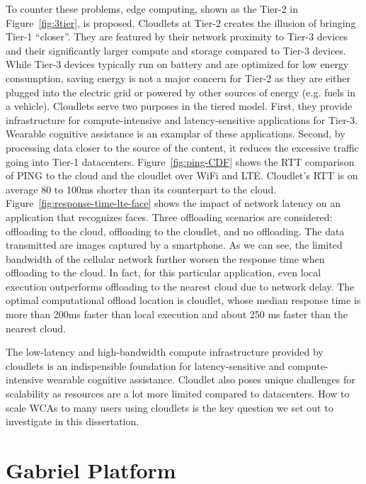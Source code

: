To counter these problems, edge computing, shown as the Tier-2 in
Figure~\ref{fig:3tier}, is proposed. Cloudlets at Tier-2 creates the illusion of
bringing Tier-1 ``closer''. They are featured by their network proximity to
Tier-3 devices and their significantly larger compute and storage compared to
Tier-3 devices. While Tier-3 devices typically run on battery and are optimized
for low energy consumption, saving energy is not a major concern for Tier-2 as
they are either plugged into the electric grid or powered by other sources of
energy (e.g. fuels in a vehicle). Cloudlets serve two purposes in the tiered
model. First, they provide infrastructure for compute-intensive and
latency-sensitive applications for Tier-3. Wearable cognitive assistance is an
examplar of these applications. Second, by processing data closer to the source
of the content, it reduces the excessive traffic going into Tier-1 datacenters.
Figure~\ref{fig:ping-CDF} shows the RTT comparison of PING to the cloud and the
cloudlet over WiFi and LTE. Cloudlet's RTT is on average 80 to 100ms shorter
than its counterpart to the cloud. Figure~\ref{fig:response-time-lte-face} shows
the impact of network latency on an application that recognizes faces. Three
offloading scenarios are considered: offloading to the cloud, offloading to the
cloudlet, and no offloading. The data transmitted are images captured by a
smartphone. As we can see, the limited bandwidth of the cellular network further
worsen the response time when offloading to the cloud. In fact, for this
particular application, even local execution outperforms offloading to the
nearest cloud due to network delay. The optimal computational offload location
is cloudlet, whose median response time is more than 200ms faster than local
execution and about 250 ms faster than the nearest cloud.

The low-latency and high-bandwidth compute infrastructure provided by cloudlets
is an indispensible foundation for latency-sensitive and compute-intensive
wearable cognitive assistance. Cloudlet also poses unique challenges for
scalability as resources are a lot more limited compared to datacenters. How to
scale WCAs to many users using cloudlets is the key question we set out to
investigate in this dissertation. 


\section{Gabriel Platform}
\label{sec: bg-gabriel}

